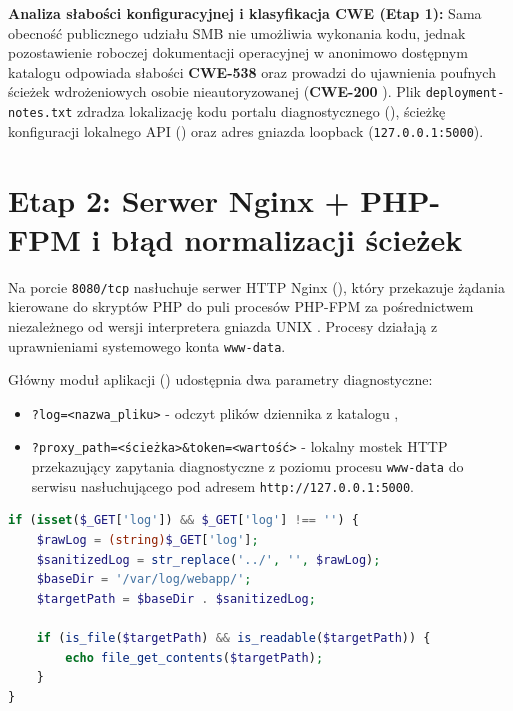 \textbf{Analiza słabości konfiguracyjnej i klasyfikacja CWE (Etap 1):} Sama obecność publicznego udziału SMB nie umożliwia wykonania kodu, jednak pozostawienie roboczej dokumentacji operacyjnej w anonimowo dostępnym katalogu  odpowiada słabości \textbf{CWE-538} \cite{cwe538} oraz prowadzi do ujawnienia poufnych ścieżek wdrożeniowych osobie nieautoryzowanej (\textbf{CWE-200} \cite{cwe200}). Plik \texttt{deployment-notes.txt} zdradza lokalizację kodu portalu diagnostycznego (), ścieżkę konfiguracji lokalnego API () oraz adres gniazda loopback (\texttt{127.0.0.1:5000}).

\section{Etap 2: Serwer Nginx + PHP-FPM i błąd normalizacji ścieżek}
\label{sec:konfiguracja-web}

Na porcie \texttt{8080/tcp} nasłuchuje serwer HTTP Nginx (), który przekazuje żądania kierowane do skryptów PHP do puli procesów PHP-FPM za pośrednictwem niezależnego od wersji interpretera gniazda UNIX . Procesy działają z uprawnieniami systemowego konta \texttt{www-data}.

Główny moduł aplikacji () udostępnia dwa parametry diagnostyczne:
\begin{itemize}
    \item \texttt{?log=<nazwa\_pliku>} - odczyt plików dziennika z katalogu ,
    \item \texttt{?proxy\_path=<ścieżka>\&token=<wartość>} - lokalny mostek HTTP przekazujący zapytania diagnostyczne z poziomu procesu \texttt{www-data} do serwisu nasłuchującego pod adresem \texttt{http://127.0.0.1:5000}.
\end{itemize}

\begin{lstlisting}[language=PHP, caption={Fragment modułu /var/www/vulnbox/index.php odpowiedzialny za walidację ścieżki logów}, label={lst:php-traversal}]
if (isset($_GET['log']) && $_GET['log'] !== '') {
    $rawLog = (string)$_GET['log'];
    $sanitizedLog = str_replace('../', '', $rawLog);
    $baseDir = '/var/log/webapp/';
    $targetPath = $baseDir . $sanitizedLog;

    if (is_file($targetPath) && is_readable($targetPath)) {
        echo file_get_contents($targetPath);
    }
}
\end{lstlisting}

